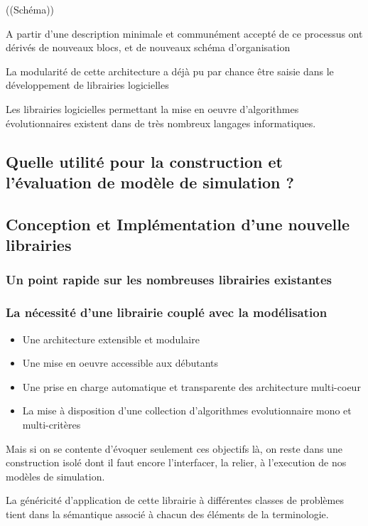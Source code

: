 ((Schéma))

A partir d'une description minimale et communément accepté de ce processus ont dérivés de nouveaux blocs, et de nouveaux schéma d'organisation

La modularité de cette architecture a déjà pu par chance être saisie dans le développement de librairies logicielles 


Les librairies logicielles permettant la mise en oeuvre d'algorithmes évolutionnaires existent dans de très nombreux langages informatiques.


\subsection{Quelle utilité pour la construction et l'évaluation de modèle de simulation ?}


\subsection{Conception et Implémentation d'une nouvelle librairies}

\subsubsection{Un point rapide sur les nombreuses librairies existantes}

\subsubsection{La nécessité d'une librairie couplé avec la modélisation}

\begin{itemize}
	\item Une architecture extensible et modulaire
	\item Une mise en oeuvre accessible aux débutants
	\item Une prise en charge automatique et transparente des architecture multi-coeur 
	\item La mise à disposition d'une collection d'algorithmes evolutionnaire mono et multi-critères 
\end{itemize}

Mais si on se contente d'évoquer seulement ces objectifs là, on reste dans une construction isolé dont il faut encore l'interfacer, la relier, à l'execution de nos modèles de simulation.

La généricité d'application de cette librairie à différentes classes de problèmes tient dans la sémantique associé à chacun des éléments de la terminologie. 

